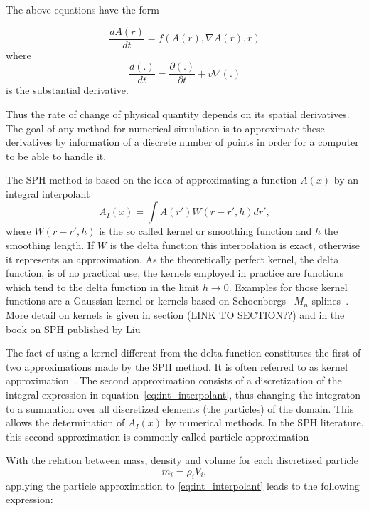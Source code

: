 \documentclass{report}
\begin{document}
The above equations have the form~\cite{Monaghan2005}

\begin {equation}
\label{eq:EFD_form}
{\frac{dA(r)}{dt}}=f(A(r),\nabla A(r),r)
\end {equation}
where
\begin {equation}
{\frac{d(.)}{dt}}={\frac{\partial(.)}{ \partial t}}+v\nabla(.)
\end{equation}
is the substantial derivative.

Thus the rate of change of  physical quantity depends on its spatial
derivatives. The goal of any method for numerical simulation is to approximate
these derivatives by information of a discrete number of points in order for a
computer to be able to handle it. 


The SPH method is based on the idea of approximating a function $A(x)$ by an
integral interpolant
\begin{equation}
\label{eq:int_interpolant}
A_I(x)=\int A(r')W(r-r',h)dr',
\end{equation}
where $W(r-r',h)$ is the so called kernel or smoothing function and $h$ the
smoothing length. If $W$ is the delta function this interpolation is exact,
otherwise it represents an approximation. As the theoretically
perfect kernel, the delta function, is of no practical use, the kernels
employed in practice are functions which tend to the delta function in the 
limit $h\rightarrow 0$.
Examples for those kernel functions are a Gaussian kernel or
kernels based on Schoenbergs~\cite{Schoenberg1946} $M_n$ splines~\cite{Monaghan2005}.
More detail on kernels is given in section
(LINK TO SECTION??) and in the book on SPH published by Liu~\cite{Liu2003}

The fact of using a kernel different from the delta function constitutes the
first of two approximations made by the SPH
method. It is often referred to as kernel approximation~\cite{Liu2003}.
The second approximation consists of a discretization of the integral
expression in equation~\ref{eq:int_interpolant}, thus changing the integraton
to a summation over all discretized elements (the particles) of the domain. 
This allows the determination of $A_I(x)$ by numerical methods. In the SPH
literature, this second approximation is commonly called particle
approximation~\cite{Liu2003}

With the relation between mass, density and volume for each discretized particle
\begin{equation}
m_i=\rho_i V_i,
\end{equation}
applying the particle approximation to \ref{eq:int_interpolant} leads to the following expression:
\end{document}
